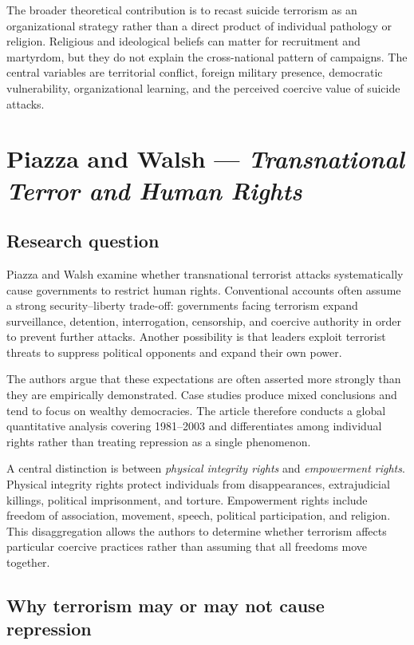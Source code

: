 The broader theoretical contribution is to recast suicide terrorism as an organizational strategy rather than a direct product of individual pathology or religion. Religious and ideological beliefs can matter for recruitment and martyrdom, but they do not explain the cross-national pattern of campaigns. The central variables are territorial conflict, foreign military presence, democratic vulnerability, organizational learning, and the perceived coercive value of suicide attacks.


\clearpage
\section{Piazza and Walsh --- \textit{Transnational Terror and Human Rights}}

\subsection{Research question}

Piazza and Walsh examine whether transnational terrorist attacks systematically cause governments to restrict human rights. Conventional accounts often assume a strong security--liberty trade-off: governments facing terrorism expand surveillance, detention, interrogation, censorship, and coercive authority in order to prevent further attacks. Another possibility is that leaders exploit terrorist threats to suppress political opponents and expand their own power.

The authors argue that these expectations are often asserted more strongly than they are empirically demonstrated. Case studies produce mixed conclusions and tend to focus on wealthy democracies. The article therefore conducts a global quantitative analysis covering 1981--2003 and differentiates among individual rights rather than treating repression as a single phenomenon.

A central distinction is between \textit{physical integrity rights} and \textit{empowerment rights}. Physical integrity rights protect individuals from disappearances, extrajudicial killings, political imprisonment, and torture. Empowerment rights include freedom of association, movement, speech, political participation, and religion. This disaggregation allows the authors to determine whether terrorism affects particular coercive practices rather than assuming that all freedoms move together.

\subsection{Why terrorism may or may not cause repression}

